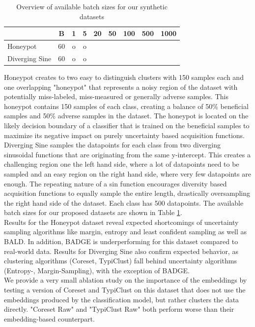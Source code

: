 \begin{table}
	\vspace{-0.7cm}
	\caption{Overview of available batch sizes for our synthetic datasets}
	\vspace{0.1cm}
	\label{tab:batch_sizes_syn}
	\begin{tabular}{l|c|c|c|c|c|c|c|c}
		& B & 1 & 5 & 20 & 50 & 100 & 500 & 1000 \\
		\hline
		Honeypot    & 60 & o & o &&&&& \\
		Diverging Sine& 60 & o & o &&&&& \\
	\end{tabular}
	\vspace{-0.35cm}
\end{table}
Honeypot creates to two easy to distinguish clusters with 150 samples each and one overlapping "honeypot" that represents a noisy region of the dataset with potentially miss-labeled, miss-measured or generally adverse samples.
This honeypot contains 150 samples of each class, creating a balance of 50\% beneficial samples and 50\% adverse samples in the dataset.
The honeypot is located on the likely decision boundary of a classifier that is trained on the beneficial samples to maximize its negative impact on purely uncertainty based acquisition functions.
Diverging Sine samples the datapoints for each class from two diverging sinusoidal functions that are originating from the same y-intercept.
This creates a challenging region one the left hand side, where a lot of datapoints need to be sampled and an easy region on the right hand side, where very few datapoints are enough. 
The repeating nature of a sin function encourages diversity based acquisition functions to equally sample the entire length, drastically oversampling the right hand side of the dataset.
Each class has 500 datapoints. The available batch sizes for our proposed datasets are shown in Table \ref{tab:batch_sizes_syn}.\\





Results for the Honeypot dataset reveal expected shortcomings of uncertainty sampling algorithms like margin, entropy and least confident sampling as well as BALD.
In addition, BADGE is underperforming for this dataset compared to real-world data. 
Results for Diverging Sine also confirm expected behavior, as clustering algorithms (Coreset, TypiClust) fall behind uncertainty algorithms (Entropy-, Margin-Sampling), with the exception of BADGE. \\
We provide a very small ablation study on the importance of the embeddings by testing a version of Coreset and TypiClust on this dataset that does not use the embeddings produced by the classification model, but rather clusters the data directly.
"Coreset Raw" and "TypiClust Raw" both perform worse than their embedding-based counterpart.

